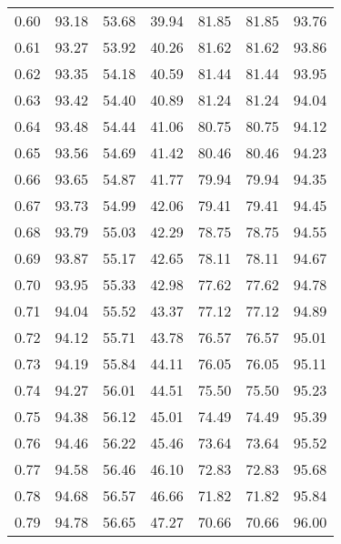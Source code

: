 \begin{tabular}{|c|c|c|c|c|c|c|}
      0.60 &     93.18 &     53.68 &      39.94 &   81.85 &      81.85 &         93.76 \\
      0.61 &     93.27 &     53.92 &      40.26 &   81.62 &      81.62 &         93.86 \\
      0.62 &     93.35 &     54.18 &      40.59 &   81.44 &      81.44 &         93.95 \\
      0.63 &     93.42 &     54.40 &      40.89 &   81.24 &      81.24 &         94.04 \\
      0.64 &     93.48 &     54.44 &      41.06 &   80.75 &      80.75 &         94.12 \\
      0.65 &     93.56 &     54.69 &      41.42 &   80.46 &      80.46 &         94.23 \\
      0.66 &     93.65 &     54.87 &      41.77 &   79.94 &      79.94 &         94.35 \\
      0.67 &     93.73 &     54.99 &      42.06 &   79.41 &      79.41 &         94.45 \\
      0.68 &     93.79 &     55.03 &      42.29 &   78.75 &      78.75 &         94.55 \\
      0.69 &     93.87 &     55.17 &      42.65 &   78.11 &      78.11 &         94.67 \\
      0.70 &     93.95 &     55.33 &      42.98 &   77.62 &      77.62 &         94.78 \\
      0.71 &     94.04 &     55.52 &      43.37 &   77.12 &      77.12 &         94.89 \\
      0.72 &     94.12 &     55.71 &      43.78 &   76.57 &      76.57 &         95.01 \\
      0.73 &     94.19 &     55.84 &      44.11 &   76.05 &      76.05 &         95.11 \\
      0.74 &     94.27 &     56.01 &      44.51 &   75.50 &      75.50 &         95.23 \\
      0.75 &     94.38 &     56.12 &      45.01 &   74.49 &      74.49 &         95.39 \\
      0.76 &     94.46 &     56.22 &      45.46 &   73.64 &      73.64 &         95.52 \\
      0.77 &     94.58 &     56.46 &      46.10 &   72.83 &      72.83 &         95.68 \\
      0.78 &     94.68 &     56.57 &      46.66 &   71.82 &      71.82 &         95.84 \\
      0.79 &     94.78 &     56.65 &      47.27 &   70.66 &      70.66 &         96.00 \\

\end{tabular}
